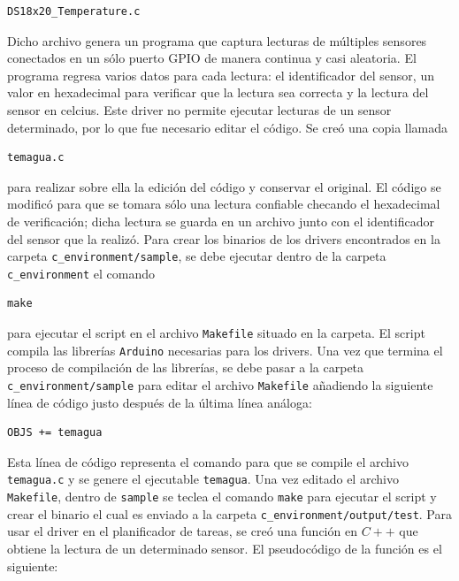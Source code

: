 \documentclass[a4paper,10pt,titlepage]{article}
\begin{document}
\begin{verbatim}
DS18x20_Temperature.c
\end{verbatim}

Dicho archivo genera un programa que captura lecturas de m\'ultiples sensores conectados en 
un s\'olo puerto GPIO de manera continua y casi aleatoria. El 
programa regresa varios datos para cada lectura: el identificador del 
sensor, un valor en hexadecimal para verificar que la lectura sea 
correcta y la lectura del sensor en celcius. Este driver no permite ejecutar lecturas de un sensor determinado, por lo que fue 
necesario editar el c\'odigo. Se cre\'o una copia llamada

\begin{verbatim}
temagua.c
\end{verbatim}

para realizar sobre ella la edici\'on del c\'odigo y conservar el original. El c\'odigo se modific\'o para que se tomara s\'olo una lectura 
confiable checando el hexadecimal de verificaci\'on; dicha lectura se guarda en un archivo 
junto con el identificador del sensor que la realiz\'o. Para 
crear los binarios de los drivers encontrados en la carpeta \verb|c_environment/sample|, se debe 
ejecutar dentro de la carpeta \verb|c_environment| el comando

\begin{verbatim}
make
\end{verbatim}

para ejecutar el script en el archivo \verb|Makefile| situado en la carpeta. El script compila las 
librer\'ias \verb|Arduino| necesarias para los drivers. Una vez que termina el 
proceso de compilaci\'on de las librer\'ias, se debe pasar a la carpeta \verb|c_environment/sample| para editar el archivo \verb|Makefile| a\~nadiendo la siguiente l\'inea 
de c\'odigo justo despu\'es de la \'ultima l\'inea an\'aloga:

\begin{verbatim}
OBJS += temagua
\end{verbatim}

Esta l\'inea de c\'odigo representa el comando para que se compile el archivo \verb|temagua.c| y se genere el ejecutable \verb|temagua|. Una vez editado el archivo 
\verb|Makefile|, dentro de \verb|sample| se teclea el comando \verb|make| para ejecutar el script y crear el binario el cual es enviado a la carpeta 
\verb|c_environment/output/test|. Para usar el driver 
en el planificador de tareas, se cre\'o una funci\'on en $C++$ que obtiene la lectura de un determinado sensor. El pseudoc\'odigo de la 
funci\'on es el siguiente:
\end{document}
